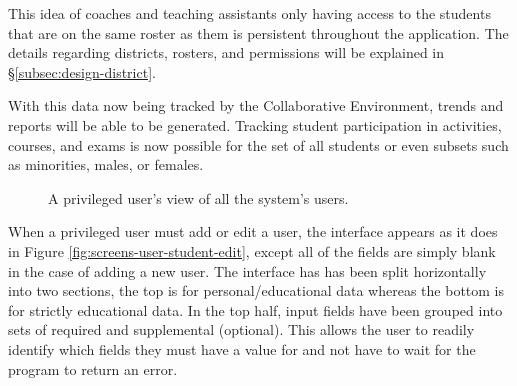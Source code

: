 This idea of coaches and teaching assistants only having access to the students that are on the same roster as them is persistent throughout the application. The details regarding districts, rosters, and permissions will be explained in \S \ref{subsec:design-district}.

With this data now being tracked by the Collaborative Environment, trends and reports will be able to be generated. Tracking student participation in activities, courses, and exams is now possible for the set of all students or even subsets such as minorities, males, or females.

\begin{figure}[h!]
	\centering
	\caption{A privileged user's view of all the system's users.}
	\label{fig:screens-user-list}
\end{figure}

When a privileged user must add or edit a user, the interface appears as it does in Figure \ref{fig:screens-user-student-edit}, except all of the fields are simply blank in the case of adding a new user. The interface has has been split horizontally into two sections, the top is for personal/educational data whereas the bottom is for strictly educational data. In the top half, input fields have been grouped into sets of required and supplemental (optional). This allows the user to readily identify which fields they must have a value for and not have to wait for the program to return an error.

